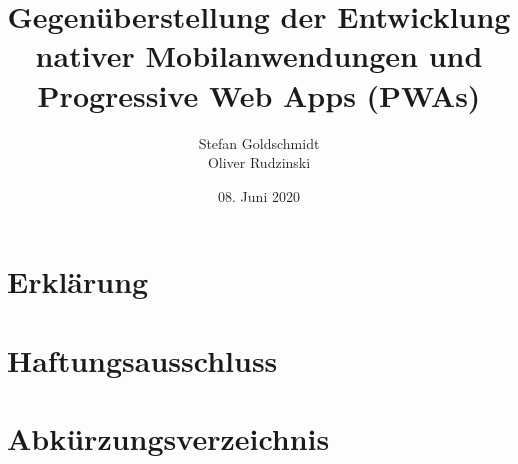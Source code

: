 


\title{Gegenüberstellung der Entwicklung\\nativer Mobilanwendungen und\\Progressive Web Apps (PWAs)} 
\author{Stefan Goldschmidt\\Oliver Rudzinski}
\date{08. Juni 2020}



\makeatletter
{}


	\clearpage
	
	\thispagestyle{empty}
	
	
	\clearpage
	\chapter*{Erklärung}
		
	\thispagestyle{empty}
	
	\clearpage
	\chapter*{Haftungsausschluss}
		
	\thispagestyle{empty}
	
	\clearpage
	
	\thispagestyle{empty}
	
	{\small\tableofcontents}
	\thispagestyle{empty}
	
	\chapter*{Abkürzungsverzeichnis}
		
	
	\listoffigures

	\listoftables

	\listoflistings


